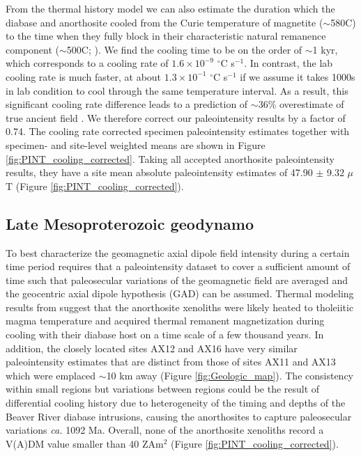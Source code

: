 \documentclass[draft]{agujournal2019}
\begin{document}
From the thermal history model we can also estimate the duration which the diabase and anorthosite cooled from the Curie temperature of magnetite ($\sim$580\textdegree C) to the time when they fully block in their characteristic natural remanence component ($\sim$500\textdegree C; ). We find the cooling time to be on the order of $\sim$1 kyr, which corresponds to a cooling rate of $1.6\times10^{-9}$ $^\circ$C s$^{-1}$. In contrast, the lab cooling rate is much faster, at about $1.3\times10^{-1}$ $^\circ$C s$^{-1}$ if we assume it takes 1000s in lab condition to cool through the same temperature interval. As a result, this significant cooling rate difference leads to a prediction of $\sim$36\% overestimate of true ancient field \cite{Halgedahl1980a}. We therefore correct our paleointensity results by a factor of 0.74. The cooling rate corrected specimen paleointensity estimates together with specimen- and site-level weighted means are shown in Figure \ref{fig:PINT_cooling_corrected}. Taking all accepted anorthosite paleointensity results, they have a site mean absolute paleointensity estimates of 47.90 $\pm$ 9.32 $\mu$T (Figure \ref{fig:PINT_cooling_corrected}). 


\subsection*{Late Mesoproterozoic geodynamo }
To best characterize the geomagnetic axial dipole field intensity during a certain time period requires that a paleointensity dataset to cover a sufficient amount of time such that paleosecular variations of the geomagnetic field are averaged and the geocentric axial dipole hypothesis (GAD) can be assumed. Thermal modeling results from  suggest that the anorthosite xenoliths were likely heated to tholeiitic magma temperature and acquired thermal remanent magnetization during cooling with their diabase host on a time scale of a few thousand years. In addition, the closely located sites AX12 and AX16 have very similar paleointensity estimates that are distinct from those of sites AX11 and AX13 which were emplaced $\sim$10 km away (Figure \ref{fig:Geologic_map}). The consistency within small regions but variations between regions could be the result of differential cooling history due to heterogeneity of the timing and depths of the Beaver River diabase intrusions, causing the anorthosites to capture paleosecular variations \textit{ca.} 1092 Ma. Overall, none of the anorthosite xenoliths record a V(A)DM value smaller than 40 ZAm$^2$ (Figure \ref{fig:PINT_cooling_corrected}). 
\end{document}
